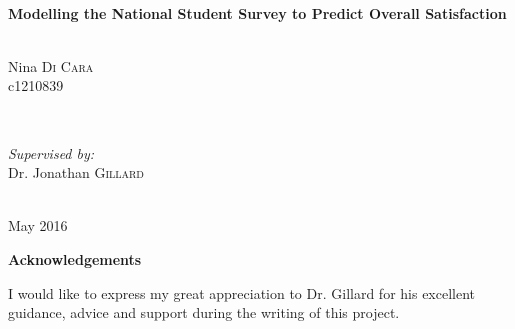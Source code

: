 \documentclass[11pt,a4paper]{report}
\begin{document}
\begin{titlepage}
	
	\vspace{1cm}
	\vspace{1.5cm}
	\HRule \\[0.4cm]
	{ \huge \bfseries Modelling the National Student Survey to Predict Overall Satisfaction}\\[0.4cm] %
	\HRule \\[1.5cm]
	
	
	\begin{minipage}{0.4\textwidth}
		\begin{flushleft} \large
			Nina \textsc{Di Cara}\\
			c1210839 %
		\end{flushleft}
	\end{minipage}
	~
	\begin{minipage}{0.4\textwidth}
		\begin{flushright} \large
			\emph{Supervised by:} \\
			Dr. Jonathan \textsc{Gillard} %
		\end{flushright}
	\end{minipage}\\[4cm]
	
	
	
	{\large May 2016}\\[3cm] %
	
	
	\vfill %
	
\end{titlepage}


\thispagestyle{empty}
\begin{centering}
{\large \bfseries{Acknowledgements}} \\
\end{centering}
\vspace{1cm}
I would like to express my great appreciation to Dr. Gillard for his excellent guidance, advice and support during the writing of this project. 
\end{document}
